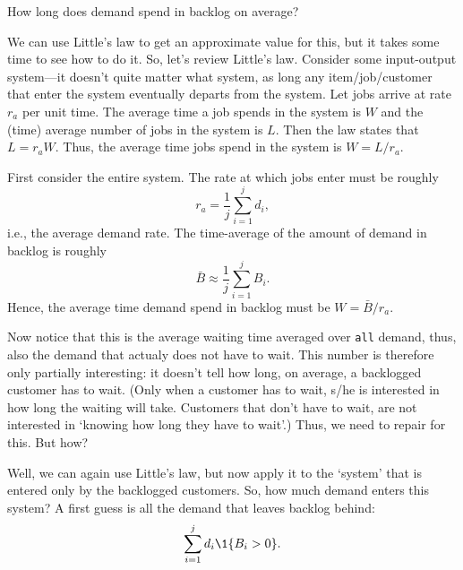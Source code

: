\begin{question}
  How long does demand spend in backlog on average?
  \begin{solution}
    We can use Little's law to get an approximate value for this, but
    it takes some time to see how to do it. So, let's review Little's
    law. Consider some input-output system---it doesn't quite matter
    what system, as long any item/job/customer that enter the system
    eventually departs from the system.  Let jobs arrive at rate $r_a$
    per unit time. The average time a job spends in the system is $W$
    and the (time) average number of jobs in the system is $L$. Then
    the law states that $L = r_a W$.  Thus, the average time jobs
    spend in the system is $W = L/r_a$.

    First consider the entire system. The rate at which jobs enter must be roughly 
    \begin{equation*}
      r_a = \frac 1 j \sum_{i=1}^j d_i,
    \end{equation*}
    i.e., the average demand rate. The time-average of the amount of
    demand in backlog is roughly
    \begin{equation*}
    \bar B \approx \frac 1 j \sum_{i=1}^j B_i.
    \end{equation*}
    Hence, the average time demand spend in backlog must be
    $W =  \bar B /r_a$.

    Now notice that this is the average waiting time averaged over
    \texttt{all} demand, thus, also the demand that actualy does not
    have to wait. This number is therefore only partially interesting:
    it doesn't tell how long, on average, a backlogged customer has to
    wait. (Only when a customer has to wait, s/he is interested in how
    long the waiting will take. Customers that don't have to wait, are
    not interested in `knowing how long they have to wait'.) Thus, we
    need to repair for this. But how? 

    Well, we can again use Little's law, but now apply it to the
    `system' that is entered only by the backlogged customers.  So,
    how much demand enters this system?  A first guess is all the demand that leaves backlog behind:
    \begin{equation*}
      \sum_{i=1}^j d_i \1{B_i > 0}.
    \end{equation*} 
 


\end{solution}
\end{question}
